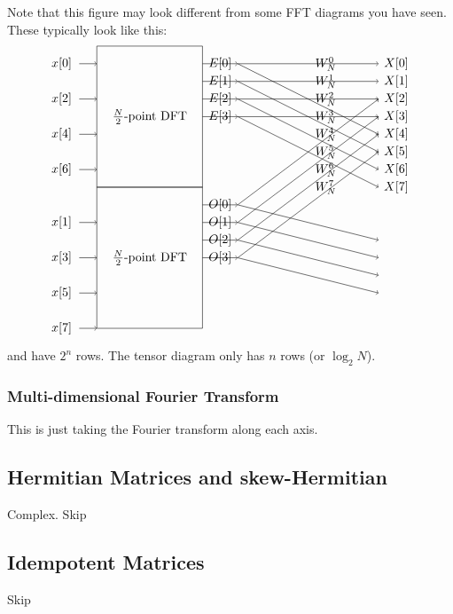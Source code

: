 Note that this figure may look different from some FFT diagrams you have seen.
These typically look like this:
\[
\begin{tikzpicture}
  \draw (0, 1) rectangle (3, 5) node[midway] {$\frac{N}{2}$-point DFT};
  \draw (0, -3) rectangle (3, 1) node[midway] {$\frac{N}{2}$-point DFT};

  \foreach \i in {0,2,4,6} {
    \node at (-1, 4.5 - \i*0.5) {$x[\i]$};
    \draw[->] (-0.5, 4.5 - \i*0.5) -- (0, 4.5 - \i*0.5);
  }
  
  \foreach \i in {1,3,5,7} {
    \node at (-1, 4.5 - \i*0.5 - 4) {$x[\i]$};
    \draw[->] (-0.5, 4.5 - \i*0.5 - 4) -- (0, 4.5 - \i*0.5 - 4);
  }

  \foreach \i in {0,1,2,3} {
    \node at (3.5, 4.5 - \i*0.5) {$E[\i]$};
    \draw[->] (3, 4.5 - \i*0.5) -- (4, 4.5 - \i*0.5);
  }
  
  \foreach \i in {0,1,2,3} {
    \node at (3.5, 4.5 - \i*0.5 - 4) {$O[\i]$};
    \draw[->] (3, 4.5 - \i*0.5 - 4) -- (4, 4.5 - \i*0.5 - 4);
  }

  \foreach \i in {0,...,7} {
    \node at (8.5, 4.5 - \i*0.5) {$X[\i]$};
  }
  
  \foreach \i in {0,...,7} {
    \node at (6.5, 4.5 - \i*0.5) {$W_N^{\i}$};
  }

  \foreach \i in {0,...,3} {
    \draw[->] (4, 4.5 - \i*0.5) -- (8, 4.5 - \i*0.5);
    \draw[->] (4, 4.5 - \i*0.5) -- (8, 4.5 - \i*0.5 - 2);
  }
  
  \foreach \i in {0,...,3} {
    \draw[->] (4, 4.5 - \i*0.5 - 4) -- (8, 4.5 - \i*0.5 - 1);
    \draw[->] (4, 4.5 - \i*0.5 - 4) -- (8, 4.5 - \i*0.5 - 5);
  }
\end{tikzpicture}
\]
and have $2^n$ rows.
The tensor diagram only has $n$ rows (or $\log_2 N$).

\subsubsection{Multi-dimensional Fourier Transform}
This is just taking the Fourier transform along each axis.

\newpage


\subsection{Hermitian Matrices and skew-Hermitian}
Complex. Skip
\subsection{Idempotent Matrices}
Skip
